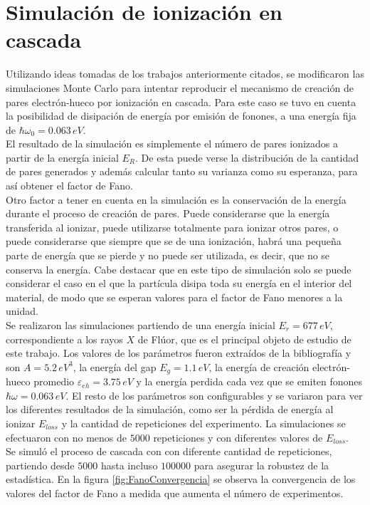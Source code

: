 \section{Simulación de ionización en cascada}
\noindent Utilizando ideas tomadas de los trabajos anteriormente citados, se modificaron las simulaciones Monte Carlo para intentar reproducir el mecanismo de creación de pares electrón-hueco por ionización en cascada. Para este caso se tuvo en cuenta la posibilidad de disipación de energía por emisión de fonones, a una energía fija de $\hbar\omega_{0} = 0.063\,eV$.\\
\indent El resultado de la simulación es simplemente el número de pares 
ionizados a partir de la energía inicial $E_{R}$. De esta puede verse la distribución de la cantidad de pares generados y además calcular tanto su varianza como su esperanza, para así obtener el factor de Fano.\\
\indent Otro factor a tener en cuenta en la simulación es la conservación de la energía durante el proceso de creación de pares. Puede considerarse que la energía transferida al ionizar, puede utilizarse totalmente para ionizar otros pares, o puede considerarse que siempre que se de una ionización, habrá una pequeña parte de energía que se pierde y no puede ser utilizada, es decir, que no se conserva la energía. Cabe destacar que en este tipo de simulación solo se puede considerar el caso en el que la partícula disipa toda su energía en el interior del material, de modo que se esperan valores para el factor de Fano menores a la unidad.\\
\indent Se realizaron las simulaciones partiendo de una energía inicial $E_{r} = 677\,\si{eV}$, correspondiente a los rayos $X$ de Flúor, que es el principal objeto de estudio de este trabajo. Los valores de los parámetros fueron extraídos de la bibliografía y son $A = 5.2\,\si{eV}^{3}$, la energía del gap $E_{g} = 1.1\,\si{eV}$, la energía de creación electrón-hueco promedio $\varepsilon_{eh} = 3.75\,\si{eV}$ y la energía perdida cada vez que se emiten fonones $\hbar \omega = 0.063\,\si{eV}$. El resto de los parámetros son configurables y se variaron para ver los diferentes resultados de la simulación, como ser la pérdida de energía al ionizar $E_{loss}$ y la cantidad de repeticiones del experimento. La simulaciones se efectuaron con no menos de $5000$ repeticiones y con diferentes valores de $E_{loss}$.\\
\indent Se simuló el proceso de cascada con con diferente cantidad de repeticiones, partiendo desde $5000$ hasta incluso $100000$ para asegurar la robustez de la estadística. En la figura \ref{fig:FanoConvergencia} se observa la convergencia de los valores del factor de Fano a medida que aumenta el número de experimentos. 
